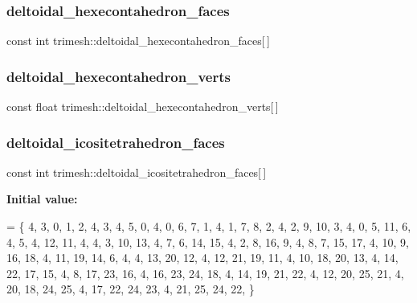 \subsubsection{\texorpdfstring{deltoidal\+\_\+hexecontahedron\+\_\+faces}{deltoidal\_hexecontahedron\_faces}}
{\footnotesize\ttfamily const int trimesh\+::deltoidal\+\_\+hexecontahedron\+\_\+faces\mbox{[}$\,$\mbox{]}\hspace{0.3cm}{\ttfamily [static]}}

\mbox{\label{namespacetrimesh_a6cd785692b5e6475b72f0b6b4100fb39}} 
\subsubsection{\texorpdfstring{deltoidal\+\_\+hexecontahedron\+\_\+verts}{deltoidal\_hexecontahedron\_verts}}
{\footnotesize\ttfamily const float trimesh\+::deltoidal\+\_\+hexecontahedron\+\_\+verts\mbox{[}$\,$\mbox{]}\hspace{0.3cm}{\ttfamily [static]}}

\mbox{\label{namespacetrimesh_a888dd617172683266ac2ed1d6b0795a8}} 
\subsubsection{\texorpdfstring{deltoidal\+\_\+icositetrahedron\+\_\+faces}{deltoidal\_icositetrahedron\_faces}}
{\footnotesize\ttfamily const int trimesh\+::deltoidal\+\_\+icositetrahedron\+\_\+faces\mbox{[}$\,$\mbox{]}\hspace{0.3cm}{\ttfamily [static]}}

{\bfseries Initial value\+:}
\begin{DoxyCode}
= \{
    4, 3, 0, 1, 2,
    4, 3, 4, 5, 0,
    4, 0, 6, 7, 1,
    4, 1, 7, 8, 2,
    4, 2, 9, 10, 3,
    4, 0, 5, 11, 6,
    4, 5, 4, 12, 11,
    4, 4, 3, 10, 13,
    4, 7, 6, 14, 15,
    4, 2, 8, 16, 9,
    4, 8, 7, 15, 17,
    4, 10, 9, 16, 18,
    4, 11, 19, 14, 6,
    4, 4, 13, 20, 12,
    4, 12, 21, 19, 11,
    4, 10, 18, 20, 13,
    4, 14, 22, 17, 15,
    4, 8, 17, 23, 16,
    4, 16, 23, 24, 18,
    4, 14, 19, 21, 22,
    4, 12, 20, 25, 21,
    4, 20, 18, 24, 25,
    4, 17, 22, 24, 23,
    4, 21, 25, 24, 22,
\}
\end{DoxyCode}
\mbox{\label{namespacetrimesh_ad7f4723827f66ff283d23720818f0dcf}} 
